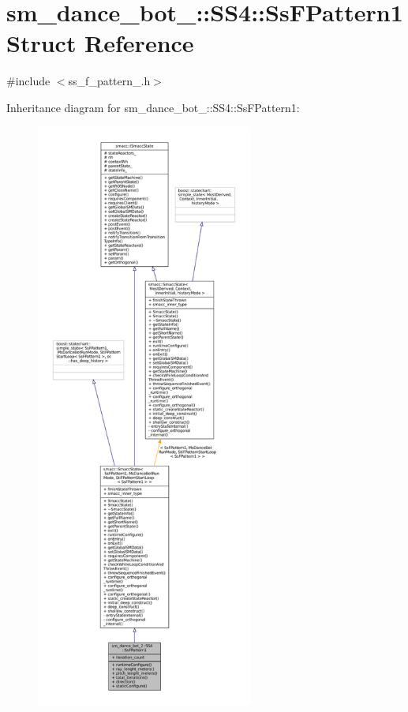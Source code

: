 \hypertarget{structsm__dance__bot__2_1_1SS4_1_1SsFPattern1}{}\section{sm\+\_\+dance\+\_\+bot\+\_\+:\+:S\+S4\+:\+:Ss\+F\+Pattern1 Struct Reference}
\label{structsm__dance__bot__2_1_1SS4_1_1SsFPattern1}


{\ttfamily \#include $<$ss\+\_\+f\+\_\+pattern\+\_.\+h$>$}



Inheritance diagram for sm\+\_\+dance\+\_\+bot\+\_\+:\+:S\+S4\+:\+:Ss\+F\+Pattern1\+:
\nopagebreak
\begin{figure}[H]
\begin{center}
\leavevmode
\includegraphics[height=550pt]{structsm__dance__bot__2_1_1SS4_1_1SsFPattern1__inherit__graph}
\end{center}
\end{figure}


